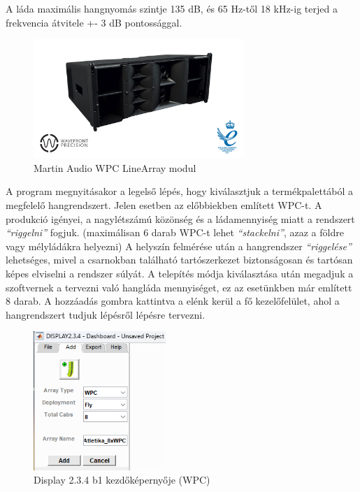 A láda maximális hangnyomás szintje 135 dB, és 65 Hz-től 18 kHz-ig terjed a frekvencia átvitele +- 3 dB pontossággal. \cite{WPCUSERGUIDE}
\begin{figure}[H]
	\centering
	\includegraphics[width=80mm, keepaspectratio]{figures/wpc_front_view.jpg}
	\caption{Martin Audio WPC LineArray modul}\label{fig:wpc}
\end{figure}
A program megnyitásakor a legelső lépés, hogy kiválasztjuk a termékpalettából a megfelelő hangrendszert.
Jelen esetben az előbbiekben említett WPC-t. A produkció igényei, a nagylétszámú közönség és a ládamennyiség miatt a rendszert
\textit{``riggelni''} fogjuk. (maximálisan 6 darab WPC-t lehet \textit{``stackelni''}, azaz a földre vagy mélyládákra helyezni)
A helyszín felmérése után a hangrendszer \textit{``riggelése''} lehetséges, mivel a csarnokban található tartószerkezet biztonságosan
és tartósan képes elviselni a rendszer súlyát.
A telepítés módja kiválasztása után megadjuk a szoftvernek a tervezni való hangláda mennyiséget, ez az esetünkben már említett 8 darab.
A hozzáadás gombra kattintva a elénk kerül a fő kezelőfelület, ahol a hangrendszert tudjuk lépésről lépésre tervezni.
\begin{figure}[H]
	\centering
	\includegraphics[width=50mm, keepaspectratio]{figures/display_wpc_0.png}
	\caption{Display 2.3.4 b1 kezdőképernyője (WPC)}\label{fig:display_wpc_0}
\end{figure}

